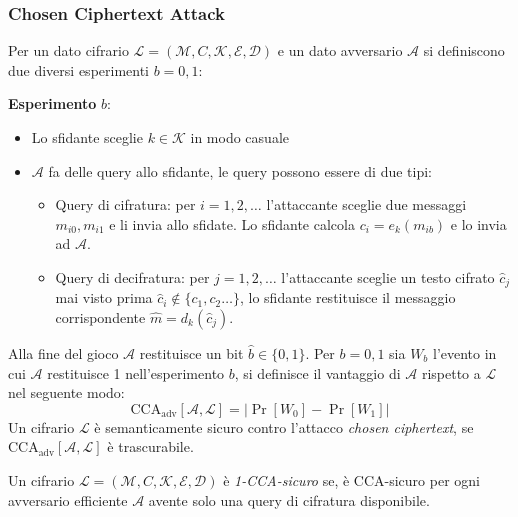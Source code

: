 \subsubsection{Chosen Ciphertext Attack}
\begin{definition}
    Per un dato cifrario $\mathcal{L} = (\mathcal{M},C,\mathcal{K},\mathcal{E},\mathcal{D})$ e un dato avversario $\mathcal{A}$ si definiscono due diversi esperimenti $b = 0,1$:
    
    \vspace{1em}
    \noindent
    \textbf{Esperimento} $b$:
    \begin{itemize}
        \item Lo sfidante sceglie $k \in \mathcal{K}$ in modo casuale
        \item $\mathcal{A}$ fa delle query allo sfidante, le query possono essere di due tipi:
        \begin{itemize}
            \item Query di cifratura: per $i = 1,2,\dots$ l'attaccante sceglie due messaggi $m_{i0}, m_{i1}$ e li invia allo sfidate. Lo sfidante calcola $c_i = e_k(m_{ib})$ e lo invia ad $\mathcal{A}$.
            \item Query di decifratura: per $j = 1,2,\dots$ l'attaccante sceglie un testo cifrato $\hat{c}_j$ mai visto prima $\hat{c}_i \notin \{c_1,c_2\dots\}$, lo sfidante restituisce il messaggio corrispondente $\hat{m} = d_{k}(\hat{c}_j)$.
        \end{itemize}
    \end{itemize}
    Alla fine del gioco $\mathcal{A}$ restituisce un bit $\hat{b} \in \{0,1\}$. Per $b = 0,1$ sia $W_b$ l'evento in cui $\mathcal{A}$ restituisce 1 nell'esperimento $b$, si definisce il vantaggio di $\mathcal{A}$ rispetto a $\mathcal{L}$ nel seguente modo:
    \[
        \text{CCA}_\text{adv}[\mathcal{A},\mathcal{L}] = |\Pr[W_0] - \Pr[W_1]|
    \]
    Un cifrario $\mathcal{L}$ è semanticamente sicuro contro l'attacco \emph{chosen ciphertext}, se $\text{CCA}_\text{adv}[\mathcal{A},\mathcal{L}]$ è trascurabile.
\end{definition}

\begin{definition}
    Un cifrario $\mathcal{L} = (\mathcal{M},C,\mathcal{K},\mathcal{E},\mathcal{D})$ è \emph{1-CCA-sicuro} se, è CCA-sicuro per ogni avversario efficiente $\mathcal{A}$ avente solo una query di cifratura disponibile.
\end{definition}

